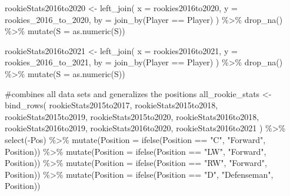 \documentclass[
  letterpaper,
  DIV=11,
  numbers=noendperiod]{scrartcl}
\newenvironment{Shaded}{\begin{snugshade}}{\end{snugshade}}
\newcommand{\AttributeTok}[1]{\textcolor[rgb]{0.40,0.45,0.13}{#1}}
\newcommand{\CommentTok}[1]{\textcolor[rgb]{0.37,0.37,0.37}{#1}}
\newcommand{\FunctionTok}[1]{\textcolor[rgb]{0.28,0.35,0.67}{#1}}
\newcommand{\NormalTok}[1]{\textcolor[rgb]{0.00,0.23,0.31}{#1}}
\newcommand{\OtherTok}[1]{\textcolor[rgb]{0.00,0.23,0.31}{#1}}
\newcommand{\SpecialCharTok}[1]{\textcolor[rgb]{0.37,0.37,0.37}{#1}}
\newcommand{\StringTok}[1]{\textcolor[rgb]{0.13,0.47,0.30}{#1}}
\begin{document}
\begin{Shaded}
\begin{Highlighting}[]
\NormalTok{rookieStats2016to2020 }\OtherTok{\textless{}{-}} \FunctionTok{left\_join}\NormalTok{(}
  \AttributeTok{x =}\NormalTok{ rookies2016to2020,}
  \AttributeTok{y =}\NormalTok{ rookies\_2016\_to\_2020,}
  \AttributeTok{by =} \FunctionTok{join\_by}\NormalTok{(Player }\SpecialCharTok{==}\NormalTok{ Player)}
\NormalTok{) }\SpecialCharTok{\%\textgreater{}\%}
  \FunctionTok{drop\_na}\NormalTok{() }\SpecialCharTok{\%\textgreater{}\%}
  \FunctionTok{mutate}\NormalTok{(}\AttributeTok{S =} \FunctionTok{as.numeric}\NormalTok{(S))}

\NormalTok{rookieStats2016to2021 }\OtherTok{\textless{}{-}} \FunctionTok{left\_join}\NormalTok{(}
  \AttributeTok{x =}\NormalTok{ rookies2016to2021,}
  \AttributeTok{y =}\NormalTok{ rookies\_2016\_to\_2021,}
  \AttributeTok{by =} \FunctionTok{join\_by}\NormalTok{(Player }\SpecialCharTok{==}\NormalTok{ Player)}
\NormalTok{) }\SpecialCharTok{\%\textgreater{}\%}
  \FunctionTok{drop\_na}\NormalTok{() }\SpecialCharTok{\%\textgreater{}\%}
  \FunctionTok{mutate}\NormalTok{(}\AttributeTok{S =} \FunctionTok{as.numeric}\NormalTok{(S))}

\CommentTok{\#combines all data sets and generalizes the positions }
\NormalTok{all\_rookie\_stats }\OtherTok{\textless{}{-}} \FunctionTok{bind\_rows}\NormalTok{(}
\NormalTok{  rookieStats2015to2017,}
\NormalTok{  rookieStats2015to2018,}
\NormalTok{  rookieStats2015to2019,}
\NormalTok{  rookieStats2015to2020,}
\NormalTok{  rookieStats2016to2018,}
\NormalTok{  rookieStats2016to2019,}
\NormalTok{  rookieStats2016to2020,}
\NormalTok{  rookieStats2016to2021}
\NormalTok{) }\SpecialCharTok{\%\textgreater{}\%}
  \FunctionTok{select}\NormalTok{(}\SpecialCharTok{{-}}\NormalTok{Pos) }\SpecialCharTok{\%\textgreater{}\%}
  \FunctionTok{mutate}\NormalTok{(}\AttributeTok{Position =} \FunctionTok{ifelse}\NormalTok{(Position }\SpecialCharTok{==} \StringTok{"C"}\NormalTok{, }\StringTok{"Forward"}\NormalTok{, Position)) }\SpecialCharTok{\%\textgreater{}\%}
  \FunctionTok{mutate}\NormalTok{(}\AttributeTok{Position =} \FunctionTok{ifelse}\NormalTok{(Position }\SpecialCharTok{==} \StringTok{"LW"}\NormalTok{, }\StringTok{"Forward"}\NormalTok{, Position)) }\SpecialCharTok{\%\textgreater{}\%}
  \FunctionTok{mutate}\NormalTok{(}\AttributeTok{Position =} \FunctionTok{ifelse}\NormalTok{(Position }\SpecialCharTok{==} \StringTok{"RW"}\NormalTok{, }\StringTok{"Forward"}\NormalTok{, Position)) }\SpecialCharTok{\%\textgreater{}\%}
  \FunctionTok{mutate}\NormalTok{(}\AttributeTok{Position =} \FunctionTok{ifelse}\NormalTok{(Position }\SpecialCharTok{==} \StringTok{"D"}\NormalTok{, }\StringTok{"Defenseman"}\NormalTok{, Position))}


\end{Highlighting}
\end{Shaded}
\end{document}
